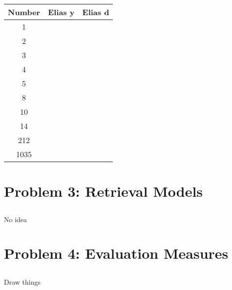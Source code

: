 \documentclass{article}
\begin{document}
\subsection{}
\begin{table}[h]
\begin{tabular}{|c|c|c|}
\hline
Number & Elias y & Elias d\\
\hline
1 & &\\
\hline
2 & & \\
\hline
3 & & \\
\hline
4 & & \\
\hline
5 & &\\
\hline
8 & & \\
\hline
10 & & \\
\hline
14 & &\\
\hline
212 & &\\
\hline
1035 & &\\
\hline
\end{tabular}
\end{table}

\subsection{}

\section{Problem 3: Retrieval Models}
\subsection{}
\subsection{}
\subsection{}
\subsection{}
No idea

\section{Problem 4: Evaluation Measures}
\subsection{}
Draw things

\subsection{}


\subsection{}

\subsection{}
\end{document}
